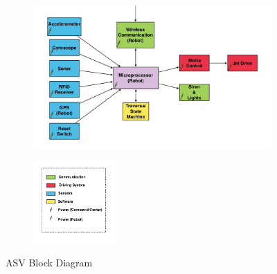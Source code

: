 \documentclass{article}
\begin{document}
\begin{figure}[H]
	\centering
\begin{subfigure}[b]{1\linewidth}		
	\begin{center}
	\centerline{\includegraphics[width=1.2\textwidth]{image/shahs_block_bottom.png}}
	\end{center}
\end{subfigure}
\begin{subfigure}[bH]{1\linewidth}
	\begin{center}
	\centerline{\includegraphics[width=0.35\textwidth]{image/shahs_block_legend.png}}
	\end{center}
	\end{subfigure}%
	\caption{ASV Block Diagram}
\end{figure}
\end{document}
